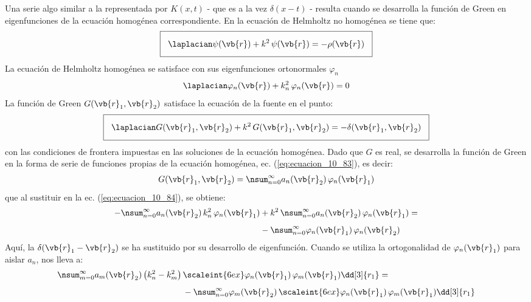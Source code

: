 Una serie algo similar a la representada por $K (x, t)$ - que es a la vez $\delta (x - t)$ - resulta cuando se desarrolla la función de Green en eigenfunciones de la ecuación homogénea correspondiente. En la ecuación de Helmholtz no homogénea se tiene que:
\begin{align}
\setlength{\fboxsep}{3\fboxsep}\boxed{
\laplacian \psi (\vb{r}) + k^{2} \, \psi (\vb{r}) = - \rho (\vb{r})
\label{eq:ecuacion_10_82}}
\end{align}
La ecuación de Helmholtz homogénea se satisface con sus eigenfunciones ortonormales $\varphi_{n}$
\begin{align}
\laplacian \varphi_{n} (\vb{r}) + k_{n}^{2} \, \varphi_{n} (\vb{r}) = 0
\label{eq:ecuacion_10_83}
\end{align} 
La función de Green $G (\vb{r}_{1}, \vb{r}_{2})$ satisface la ecuación de la fuente en el punto:
\begin{align}
\setlength{\fboxsep}{3\fboxsep}\boxed{
\laplacian G (\vb{r}_{1}, \vb{r}_{2}) + k^{2} \, G (\vb{r}_{1}, \vb{r}_{2}) = - \delta (\vb{r}_{1}, \vb{r}_{2})}
\label{eq:ecuacion_10_84}
\end{align}
con las condiciones de frontera impuestas en las soluciones de la ecuación homogénea. Dado que $G$ es real, se desarrolla la función de Green en la forma de serie de funciones propias de la ecuación homogénea, ec. (\ref{eq:ecuacion_10_83}), es decir:
\begin{align}
G (\vb{r}_{1}, \vb{r}_{2}) = \nsum_{n=0}^{\infty} a_{n} (\vb{r}_{2}) \, \varphi_{n} (\vb{r}_{1})
\label{eq:ecuacion_10_85}
\end{align}
que al sustituir en la ec. (\ref{eq:ecuacion_10_84}), se obtiene:
\begin{align}
\begin{aligned}[b]
- \nsum_{n=0}^{\infty} a_{n} (\vb{r}_{2}) \, k_{n}^{2} \, \varphi_{n} (\vb{r}_{1}) &+ k^{2} \, \nsum_{n=0}^{\infty} a_{n} (\vb{r}_{2}) \, \varphi_{n} (\vb{r}_{1}) = \\[0.5em]
&- \nsum_{n=0}^{\infty} \varphi_{n} (\vb{r}_{1}) \, \varphi_{n} (\vb{r}_{2})
\end{aligned}
\label{eq:ecuacion_10_86}
\end{align}
Aquí, la $\delta (\vb{r}_{1} - \vb{r}_{2})$ se ha sustituido por su desarrollo de eigenfunción. Cuando se utiliza la ortogonalidad de $\varphi_{n} (\vb{r}_{1})$ para aislar $a_{n}$, nos lleva a:
\begin{align*}
\nsum_{m=0}^{\infty} a_{m} (\vb{r}_{2}) \, \big( k_{n}^{2} - k_{m}^{2} \big) \, &\scaleint{6ex} \varphi_{n} (\vb{r}_{1}) \, \varphi_{m} (\vb{r}_{1}) \dd[3]{r_{1}} = \\[0.5em]
&- \nsum_{n=0}^{\infty} \varphi_{m} (\vb{r}_{2})  \, \scaleint{6ex} \varphi_{n} (\vb{r}_{1}) \, \varphi_{m} (\vb{r}_{1}) \dd[3]{r_{1}}    
\end{align*} 
